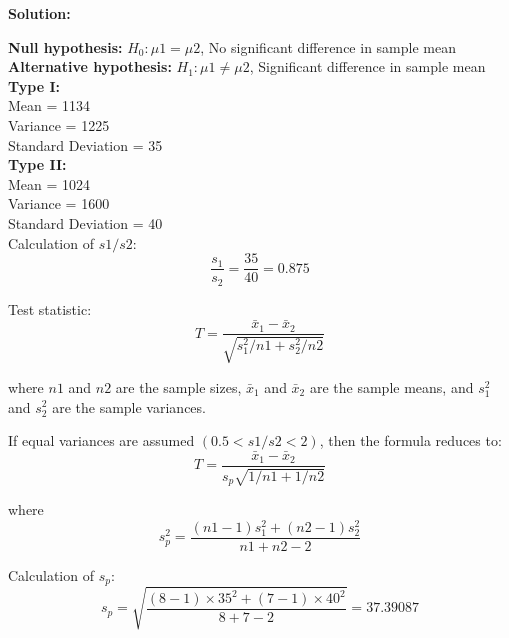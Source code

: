 \documentclass[a4paper,11pt,openright]{report}
\begin{document}
\begin{enumerate}
\textbf{Solution:}

\textbf{Null hypothesis:} $H_{0}: \mu 1 = \mu 2$, No significant difference in sample mean
\\
\textbf{Alternative hypothesis:} $H_{1}: \mu 1 \neq \mu 2$, Significant difference in sample
mean \\

\textbf{Type I:} \\
\hspace*{10mm} Mean = 1134 \\
\hspace*{10mm} Variance = 1225 \\
\hspace*{10mm} Standard Deviation = 35 \\

\textbf{Type II:} \\
\hspace*{10mm} Mean = 1024 \\
\hspace*{10mm} Variance = 1600 \\
\hspace*{10mm} Standard Deviation = 40 \\

Calculation of $s1/s2$:
\begin{equation*}
\frac{s_{1}}{s_{2}} = \frac{35}{40} = 0.875
\end{equation*}

Test statistic: 
\begin{equation*}
T = \frac{\bar x_{1} - \bar x_{2}}{\sqrt{s_{1}^{2}/n1 + s_{2}^{2}/n2}}
\end{equation*}

where $n1$ and $n2$ are the sample sizes, $\bar x_{1}$ and $\bar x_{2}$ are the sample
means, and $s_{1}^{2}$ and $s_{2}^{2}$ are the sample variances. 

If equal variances are assumed $(0.5 < s1/s2 < 2)$, then the formula reduces to:
\begin{equation*}
T = \frac{\bar x_{1} - \bar x_{2}}{s_{p} \sqrt{1/n1 + 1/n2}}
\end{equation*}

where
\begin{equation*}
s_{p}^{2} = \frac{(n1-1)s_{1}^{2} + (n2-1)s_{2}^{2}}{n1+n2-2}
\end{equation*}

Calculation of $s_{p}$:
\begin{equation*}
s_{p} = \sqrt{\frac{(8-1) \times 35^{2} + (7-1) \times 40^{2}}{8+7-2}} 
      = 37.39087
\end{equation*}


\end{enumerate}
\end{document}
